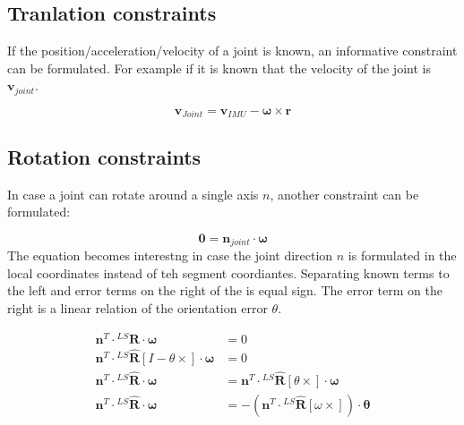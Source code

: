 \documentclass{article}
\begin{document}
\subsection{Tranlation constraints}
If the position/acceleration/velocity of a joint is known, an informative constraint can be formulated. For example if it is known that the velocity of the joint is $\boldsymbol{v}_{joint}$.

\begin{equation} \label{eq:joint_velocity_constraint}
\boldsymbol{v}_{Joint} = \boldsymbol{v}_{IMU} - \boldsymbol{\omega} \times \boldsymbol{r}
\end{equation}

\subsection{Rotation constraints}
In case a joint can rotate around a single axis $n$, another constraint can be formulated:

\begin{equation} \label{eq:joint_rotation_constraint}
\boldsymbol{0} = \boldsymbol{n}_{joint} \cdot \boldsymbol{\omega} 
\end{equation}
The equation becomes interestng in case the joint direction $n$ is formulated in the local coordinates instead of teh segment coordiantes. Separating known terms to the left and error terms on the right of the is equal sign. The error term on the right is a linear relation of the orientation error $\theta$.

\begin{equation} \label{eq:joint_velocity_constraint_linearized}
\begin{aligned}
\boldsymbol{n}^T \cdot {}^{LS}{\boldsymbol{R}} \cdot \boldsymbol{\omega} &= 0 \\
\boldsymbol{n}^T \cdot {}^{LS}{\hat{\boldsymbol{R}}} \left[I - \theta \times  \right]  \cdot \boldsymbol{\omega} &= 0 \\
\boldsymbol{n}^T \cdot {}^{LS}{\hat{\boldsymbol{R}}} \cdot \boldsymbol{\omega} &= \boldsymbol{n}^T \cdot {}^{LS}{\hat{\boldsymbol{R}}} \left[\theta \times  \right]  \cdot \boldsymbol{\omega} \\
\boldsymbol{n}^T \cdot {}^{LS}{\hat{\boldsymbol{R}}} \cdot \boldsymbol{\omega} &= -(\boldsymbol{n}^T \cdot {}^{LS}{\hat{\boldsymbol{R}}} \left[\omega \times  \right])  \cdot \boldsymbol{\theta} \\
\end{aligned}
\end{equation}
\end{document}
